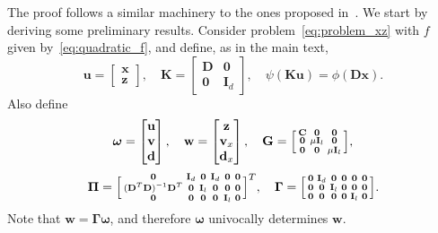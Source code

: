 \documentclass[10pt,twocolumn,twoside]{IEEEtran}
\newcommand{\x}{\mathbf{x}} %
\newcommand{\z}{\mathbf{z}} %
\newcommand{\vs}{\mathbf{v}} %
\newcommand{\dv}{\mathbf{d}} %
\newcommand{\D}{\mathbf{D}} %
\newcommand{\wt}{\mathbf{w}} %
\newcommand{\C}{\mathbf{C}} %
\newcommand{\I}{\mathbf{I}} %
\newcommand{\G}{\mathbf{G}} %
\newcommand{\K}{\mathbf{K}} %
\newcommand{\uu}{\mathbf{u}} %
\begin{document}
The proof follows a similar machinery to the ones proposed in~\cite{Chen1994, He2002, He2012a, Deng2012, Yang2011}. We start by deriving some preliminary results. Consider problem~\eqref{eq:problem_xz} with $f$ given by~\eqref{eq:quadratic_f}, and define, as in the main text,
\begin{equation*}
\uu = \begin{bmatrix}
\x \\
\z
\end{bmatrix},
\quad\K = \begin{bmatrix}
\D & \mathbf{0} \\
\mathbf{0} & \I_{d}
\end{bmatrix},
\quad
\psi (\K \uu ) = \phi(\D \x).
\end{equation*}
Also define
\begin{equation*}
\bm{\omega} = \begin{bmatrix}\uu \\ \vs \\ \dv \end{bmatrix},
\quad \wt = \begin{bmatrix}\z \\ \vs_x \\ \dv_x \end{bmatrix},
\quad \G = \Bigl[ \begin{smallmatrix}
\C & \mathbf{0} & \mathbf{0}\\ \mathbf{0} &\mu \mathbf{I}_l & \mathbf{0}\\ \mathbf{0} & \mathbf{0}&\mu \mathbf{I}_l
\end{smallmatrix} \Bigl],
\end{equation*}
\begin{equation*}
\bm{\Pi} = \Bigl[ \begin{smallmatrix}
\mathbf{0} & \mathbf{I}_d & \mathbf{0} & \mathbf{I}_d & \mathbf{0} & \mathbf{0}\\
(\D^T \D)^{-1} \D^T & \mathbf{0} & \mathbf{I}_l & \mathbf{0} & \mathbf{0} & \mathbf{0}\\
\mathbf{0}  & \mathbf{0} & \mathbf{0} & \mathbf{0} & \mathbf{I}_l & \mathbf{0} \end{smallmatrix} \Bigl]^T,
\quad \bm{\Gamma} = \Bigl[ \begin{smallmatrix}
\mathbf{0} & \mathbf{I}_d & \mathbf{0} & \mathbf{0} & \mathbf{0} & \mathbf{0}\\
\mathbf{0} & \mathbf{0} & \mathbf{I}_l & \mathbf{0} & \mathbf{0} & \mathbf{0}\\
\mathbf{0} & \mathbf{0} & \mathbf{0} & \mathbf{0} & \mathbf{I}_l & \mathbf{0} \end{smallmatrix} \Bigl].
\end{equation*}
Note that $\wt = \bm{\Gamma} \bm{\omega}$, and therefore $\bm{\omega}$ univocally determines $\wt$.
\end{document}
